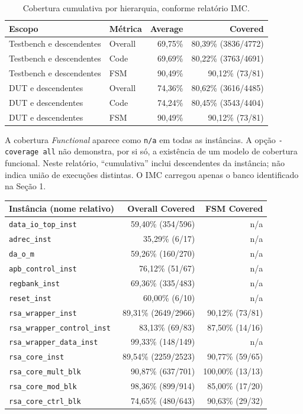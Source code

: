 \documentclass[11pt,a4paper]{article}
\begin{document}
\begin{table}[htbp]
\centering
\begin{tabular}{@{}llrr@{}}
\toprule
Escopo & Métrica & Average & Covered \\
\midrule
Testbench e descendentes & Overall & 69,75\% & 80,39\% (3836/4772) \\
Testbench e descendentes & Code & 69,69\% & 80,22\% (3763/4691) \\
Testbench e descendentes & FSM & 90,49\% & 90,12\% (73/81) \\
\midrule
DUT e descendentes & Overall & 74,36\% & 80,62\% (3616/4485) \\
DUT e descendentes & Code & 74,24\% & 80,45\% (3543/4404) \\
DUT e descendentes & FSM & 90,49\% & 90,12\% (73/81) \\
\bottomrule
\end{tabular}
\caption{Cobertura cumulativa por hierarquia, conforme relatório IMC.}
\label{tab:coverage}
\end{table}

A cobertura \emph{Functional} aparece como \texttt{n/a} em todas as
instâncias. A opção \texttt{-coverage all} não demonstra, por si só,
a existência de um modelo de cobertura funcional. Neste relatório,
``cumulativa'' inclui descendentes da instância; não indica união de
execuções distintas. O IMC carregou apenas o banco identificado na Seção 1.

\begin{center}
\small
\begin{tabular}{@{}lrr@{}}
\toprule
Instância (nome relativo) & Overall Covered & FSM Covered \\
\midrule
\texttt{data\_io\_top\_inst} & 59,40\% (354/596) & n/a \\
\quad\texttt{adrec\_inst} & 35,29\% (6/17) & n/a \\
\quad\texttt{da\_o\_m} & 59,26\% (160/270) & n/a \\
\texttt{apb\_control\_inst} & 76,12\% (51/67) & n/a \\
\texttt{regbank\_inst} & 69,36\% (335/483) & n/a \\
\texttt{reset\_inst} & 60,00\% (6/10) & n/a \\
\texttt{rsa\_wrapper\_inst} & 89,31\% (2649/2966) & 90,12\% (73/81) \\
\quad\texttt{rsa\_wrapper\_control\_inst} & 83,13\% (69/83) & 87,50\% (14/16) \\
\quad\texttt{rsa\_wrapper\_data\_inst} & 99,33\% (148/149) & n/a \\
\quad\texttt{rsa\_core\_inst} & 89,54\% (2259/2523) & 90,77\% (59/65) \\
\quad\texttt{rsa\_core\_mult\_blk} & 90,87\% (637/701) & 100,00\% (13/13) \\
\quad\texttt{rsa\_core\_mod\_blk} & 98,36\% (899/914) & 85,00\% (17/20) \\
\quad\texttt{rsa\_core\_ctrl\_blk} & 74,65\% (480/643) & 90,63\% (29/32) \\
\bottomrule
\end{tabular}
\end{center}
\end{document}
